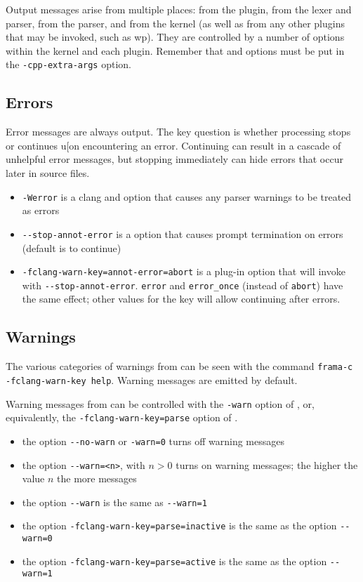 Output messages arise from multiple places: from the \fcl plugin, from the \irg lexer and parser, from the \clang parser, and from the \framac kernel (as well as from any other plugins that may be invoked, such as wp). They are controlled by a number of options within the \fc kernel and each plugin. Remember that \cl and \irg options must be put in the \lstinline|-cpp-extra-args| option.

\subsection{Errors}

Error messages are always output. The key question is whether processing stops or continues u[on encountering an error. 
Continuing can result in a cascade of unhelpful error messages, but stopping immediately can hide errors that occur later in source files.
\begin{itemize}
\item \lstinline|-Werror| is a clang and \irg option that causes any parser warnings to be treated as errors
\item \lstinline|--stop-annot-error| is a \irg option that causes prompt termination on errors (default is to continue)
\item \lstinline|-fclang-warn-key=annot-error=abort| is a \fcl plug-in option that will invoke \irg with \lstinline|--stop-annot-error|.  \lstinline|error| and \lstinline|error_once| (instead of \lstinline|abort|) have the same effect; other values for the key will allow continuing after errors.
\end{itemize}

\subsection{Warnings}

The various categories of warnings from \fcl can be seen with the command \lstinline|frama-c -fclang-warn-key help|.
Warning messages are emitted by default.

Warning messages from \irg can be controlled with the \lstinline|-warn| option of \irg, or, equivalently, the \lstinline|-fclang-warn-key=parse| option of \fc.

\begin{itemize}
\item the \irg option \lstinline|--no-warn| or \lstinline|-warn=0| turns off \irg warning messages
\item the \irg option \lstinline|--warn=<n>|, with $n > 0$ turns on \irg warning messages; the higher the value $n$ the more messages
\item the \irg option \lstinline|--warn| is the same as \lstinline|--warn=1|
\item the \fc option \lstinline|-fclang-warn-key=parse=inactive| is the same as the \irg option  \lstinline|--warn=0|
\item the \fc option \lstinline|-fclang-warn-key=parse=active| is the same as the \irg option  \lstinline|--warn=1|
\end{itemize}

